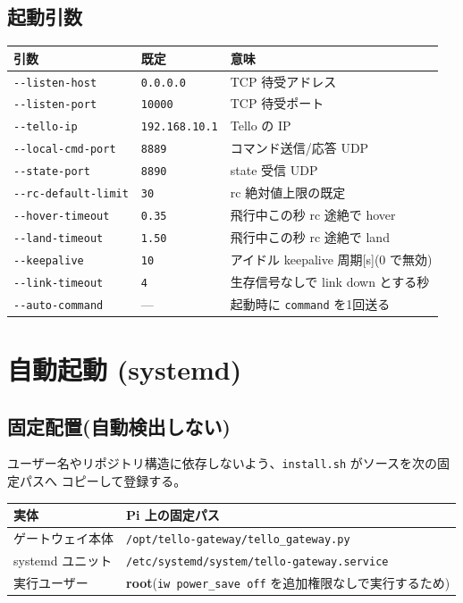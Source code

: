 \documentclass[11pt,a4paper]{ltjsarticle}
\newcommand{\code}[1]{\texttt{\small #1}}
\begin{document}
\subsection{起動引数}
\begin{longtable}{@{}p{4.0cm}p{2.2cm}p{8.8cm}@{}}
\toprule
\textbf{引数} & \textbf{既定} & \textbf{意味} \\
\midrule
\endhead
\code{-{}-listen-host} & \code{0.0.0.0} & TCP 待受アドレス \\
\code{-{}-listen-port} & \code{10000} & TCP 待受ポート \\
\code{-{}-tello-ip} & \code{192.168.10.1} & Tello の IP \\
\code{-{}-local-cmd-port} & \code{8889} & コマンド送信/応答 UDP \\
\code{-{}-state-port} & \code{8890} & state 受信 UDP \\
\code{-{}-rc-default-limit} & \code{30} & rc 絶対値上限の既定 \\
\code{-{}-hover-timeout} & \code{0.35} & 飛行中この秒 rc 途絶で hover \\
\code{-{}-land-timeout} & \code{1.50} & 飛行中この秒 rc 途絶で land \\
\code{-{}-keepalive} & \code{10} & アイドル keepalive 周期[s](0 で無効) \\
\code{-{}-link-timeout} & \code{4} & 生存信号なしで link down とする秒 \\
\code{-{}-auto-command} & --- & 起動時に \code{command} を1回送る \\
\bottomrule
\end{longtable}

\section{自動起動 (systemd)}

\subsection{固定配置(自動検出しない)}
ユーザー名やリポジトリ構造に依存しないよう、\code{install.sh} がソースを次の固定パスへ
コピーして登録する。

\begin{longtable}{@{}p{4.6cm}p{10.4cm}@{}}
\toprule
\textbf{実体} & \textbf{Pi 上の固定パス} \\
\midrule
\endhead
ゲートウェイ本体 & \code{/opt/tello-gateway/tello\_gateway.py} \\
systemd ユニット & \code{/etc/systemd/system/tello-gateway.service} \\
実行ユーザー & \textbf{root}(\code{iw power\_save off} を追加権限なしで実行するため) \\
\bottomrule
\end{longtable}
\end{document}
